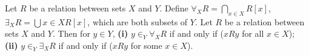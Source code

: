  Let $R$ be a relation between sets $X$ and $Y$. Define $\forall_X R = \bigcap_{x \in X} R[x]$, $\exists_X R = \bigcup{x \in X} R[x]$, which are both subsets of $Y$.
 Let $R$ be a relation between sets $X$ and $Y$. Then for $y \in Y$, \textbf{(i)} $y \in_Y \forall_X R$ if and only if ($xRy$ for all $x \in X$); \textbf{(ii)} $y \in_Y \exists_X R$ if and only if ($xRy$ for some $x \in X$).
